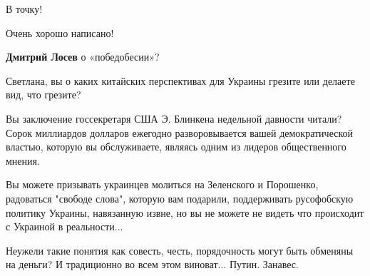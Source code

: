 \begin{itemize}
\begin{itemize}
 
В точку!
\end{itemize}

 
Очень хорошо написано!

\begin{itemize}
 
\textbf{Дмитрий Лосев} о «победобесии»?
\end{itemize}

 

Светлана, вы о каких китайских перспективах для Украины грезите или делаете
вид, что грезите?

Вы заключение госсекретаря США Э. Блинкена недельной давности читали? Сорок
миллиардов долларов ежегодно разворовывается вашей демократической властью,
которую вы обслуживаете, являясь одним из лидеров общественного мнения.

Вы можете призывать украинцев молиться на Зеленского и Порошенко, радоваться
"свободе слова", которую вам подарили, поддерживать русофобскую политику
Украины, навязанную извне, но вы не можете не видеть что происходит с Украиной
в реальности...

Неужели такие понятия как совесть, честь, порядочность могут быть обменяны на
деньги? И традиционно во всем этом виноват... Путин. Занавес.

 

\end{itemize}

